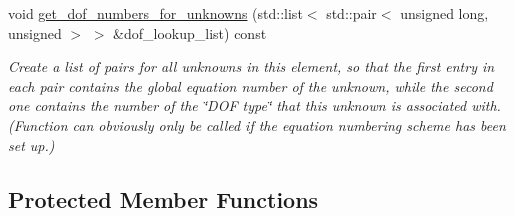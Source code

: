 \begin{DoxyCompactItemize}
void \hyperlink{classoomph_1_1AxisymmetricTCrouzeixRaviartElement_adfcf1da97da7737429199f89e182fb00}{get\+\_\+dof\+\_\+numbers\+\_\+for\+\_\+unknowns} (std\+::list$<$ std\+::pair$<$ unsigned long, unsigned $>$ $>$ \&dof\+\_\+lookup\+\_\+list) const
\begin{DoxyCompactList}\small\item\em Create a list of pairs for all unknowns in this element, so that the first entry in each pair contains the global equation number of the unknown, while the second one contains the number of the \char`\"{}\+D\+O\+F type\char`\"{} that this unknown is associated with. (Function can obviously only be called if the equation numbering scheme has been set up.) \end{DoxyCompactList}\end{DoxyCompactItemize}
\subsection*{Protected Member Functions}
